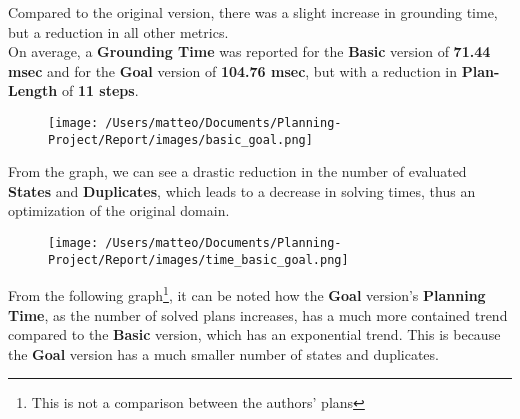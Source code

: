 \documentclass{article}
\begin{document}
\noindent
Compared to the original version, there was a slight increase in grounding time, 
but a reduction in all other metrics.\\
On average, a \textbf{Grounding Time} was reported for the \textbf{Basic} version of \textbf{71.44 msec} and for the \textbf{Goal} version of \textbf{104.76 msec}, but with a reduction in \textbf{Plan-Length} of \textbf{11 steps}.
\begin{figure}[H]
    \centering
    \texttt{[image: /Users/matteo/Documents/Planning-Project/Report/images/basic\_goal.png]}
    \label{fig:goal}
\end{figure}
\noindent
From the graph, we can see a drastic reduction in the number of evaluated \textbf{States} and \textbf{Duplicates},
 which leads to a decrease in solving times, thus an optimization of the original domain.
\begin{figure}[H]
    \centering
    \texttt{[image: /Users/matteo/Documents/Planning-Project/Report/images/time\_basic\_goal.png]}
    \label{fig:goal_states}
\end{figure}
\noindent
From the following graph\footnote{This is not a comparison between the authors' plans}, it can be noted how the \textbf{Goal} version's \textbf{Planning Time}, as the number of solved plans increases, 
has a much more contained trend compared to the \textbf{Basic} version, which has an exponential trend.
This is because the \textbf{Goal} version has a much smaller number of states and duplicates.
\end{document}
